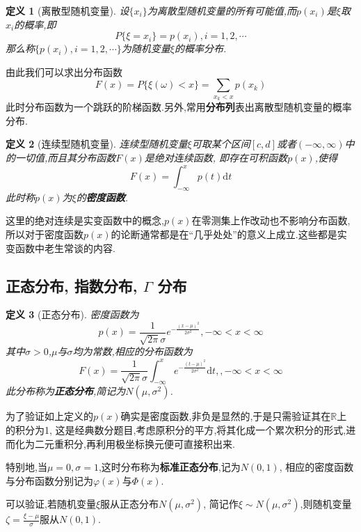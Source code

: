 \documentclass[12pt,a4paper]{article}
\newtheorem{definition}{定义}[subsection] %
\begin{document}
\begin{definition}[离散型随机变量]
    设$\{x_i\}$为离散型随机变量的所有可能值,而$p(x_i)$是$\xi$取$x_i$的概率,即\[P\{\xi = x_i\} = p(x_i),i=1,2,\cdots\]
    那么称$\{p(x_i),i=1,2,\cdots\}$为随机变量$\xi$的概率分布.
\end{definition}
由此我们可以求出分布函数\[F(x) = P\{\xi(\omega)<x\}=\sum_{x_k<x}p(x_k)\]
此时分布函数为一个跳跃的阶梯函数.另外,常用\textbf{分布列}表出离散型随机变量的概率分布.
\begin{definition}[连续型随机变量]
    连续型随机变量$\xi$可取某个区间$[c,d]$或者$(-\infty,\infty)$中的一切值,而且其分布函数$F(x)$是绝对连续函数,
    即存在可积函数$p(x)$,使得\[F(x) = \int_{-\infty}^x p(t) \mathrm{d}t\]此时称$p(x)$为$\xi$的\textbf{密度函数}.
\end{definition}
这里的绝对连续是实变函数中的概念,$p(x)$在零测集上作改动也不影响分布函数,
所以对于密度函数$p(x)$的论断通常都是在“几乎处处”的意义上成立.这些都是实变函数中老生常谈的内容.
\subsection{正态分布, 指数分布, $\Gamma$ 分布}
\begin{definition}[正态分布]
    密度函数为\[p(x)=\frac{1}{\sqrt{2\pi}\sigma}e^{-\frac{(x-\mu)^2}{2\sigma^2}},-\infty<x<\infty\]
    其中$\sigma>0$,$\mu$与$\sigma$均为常数,相应的分布函数为
    \[F(x)=\frac{1}{\sqrt{2\pi}\sigma} \int_{-\infty}^{x} e^{-\frac{(t-\mu)^2}{2\sigma^2}} \mathrm{d}t,,-\infty<x<\infty\]
    此分布称为\textbf{正态分布},简记为$N(\mu,\sigma^2)$.
\end{definition}
为了验证如上定义的$p(x)$确实是密度函数,非负是显然的,于是只需验证其在$\mathbb{R}$上的积分为1,
这是经典数分题目,考虑原积分的平方,将其化成一个累次积分的形式,进而化为二元重积分,再利用极坐标换元便可直接积出来.

特别地,当$\mu = 0, \sigma = 1$,这时分布称为\textbf{标准正态分布},记为$N(0,1)$,
相应的密度函数与分布函数分别记为$\varphi(x)$与$\varPhi(x)$.

可以验证,若随机变量$\xi$服从正态分布$N(\mu,\sigma^2)$,
简记作$\xi \sim N(\mu,\sigma^2)$,则随机变量$\zeta=\frac{\xi - \mu}{\sigma}$服从$N(0,1)$.
\end{document}
